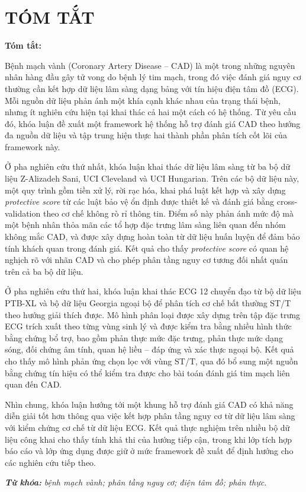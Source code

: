 \clearpage
{}

\chapter*{\fontsize{13}{13}\selectfont\textbf{TÓM TẮT}}
\fontsize{12}{15.6}\selectfont
\noindent\textbf{Tóm tắt:}

\blocksep

Bệnh mạch vành (Coronary Artery Disease -- CAD) là một trong những nguyên nhân hàng đầu gây tử vong do bệnh lý tim mạch, trong đó việc đánh giá nguy cơ thường cần kết hợp dữ liệu lâm sàng dạng bảng với tín hiệu điện tâm đồ (ECG). Mỗi nguồn dữ liệu phản ánh một khía cạnh khác nhau của trạng thái bệnh, nhưng ít nghiên cứu hiện tại khai thác cả hai một cách có hệ thống. Từ yêu cầu đó, khóa luận đề xuất một framework hệ thống hỗ trợ đánh giá CAD theo hướng đa nguồn dữ liệu và tập trung hiện thực hai thành phần phân tích cốt lõi của framework này.

\blocksep

Ở pha nghiên cứu thứ nhất, khóa luận khai thác dữ liệu lâm sàng từ ba bộ dữ liệu Z-Alizadeh Sani, UCI Cleveland và UCI Hungarian. Trên các bộ dữ liệu này, một quy trình gồm tiền xử lý, rời rạc hóa, khai phá luật kết hợp và xây dựng \textit{protective score} từ các luật bảo vệ ổn định được thiết kế và đánh giá bằng cross-validation theo cơ chế không rò rỉ thông tin. Điểm số này phản ánh mức độ mà một bệnh nhân thỏa mãn các tổ hợp đặc trưng lâm sàng liên quan đến nhóm không mắc CAD, và được xây dựng hoàn toàn từ dữ liệu huấn luyện để đảm bảo tính khách quan trong đánh giá. Kết quả cho thấy \textit{protective score} có quan hệ nghịch rõ với nhãn CAD và cho phép phân tầng nguy cơ tương đối nhất quán trên cả ba bộ dữ liệu.

\blocksep

Ở pha nghiên cứu thứ hai, khóa luận khai thác ECG 12 chuyển đạo từ bộ dữ liệu PTB-XL và bộ dữ liệu Georgia ngoại bộ để phân tích cơ chế bất thường ST/T theo hướng giải thích được. Mô hình phân loại được xây dựng trên tập đặc trưng ECG trích xuất theo từng vùng sinh lý và được kiểm tra bằng nhiều hình thức bằng chứng bổ trợ, bao gồm phản thực mức đặc trưng, phản thực mức dạng sóng, đối chứng âm tính, quan hệ liều -- đáp ứng và xác thực ngoại bộ. Kết quả cho thấy mô hình phản ứng chọn lọc với vùng ST/T, qua đó bổ sung một nguồn bằng chứng tín hiệu có thể kiểm tra được cho bài toán đánh giá tim mạch liên quan đến CAD.

\blocksep

Nhìn chung, khóa luận hướng tới một khung hỗ trợ đánh giá CAD có khả năng diễn giải tốt hơn thông qua việc kết hợp phân tầng nguy cơ từ dữ liệu lâm sàng với kiểm chứng cơ chế từ dữ liệu ECG. Kết quả thực nghiệm trên nhiều bộ dữ liệu công khai cho thấy tính khả thi của hướng tiếp cận, trong khi lớp tích hợp báo cáo và lớp ứng dụng được giữ ở mức framework đề xuất để định hướng cho các nghiên cứu tiếp theo.

\vspace{0.5cm}
\noindent\textit{\textbf{Từ khóa:}} \textit{bệnh mạch vành; phân tầng nguy cơ; điện tâm đồ; phản thực.}
